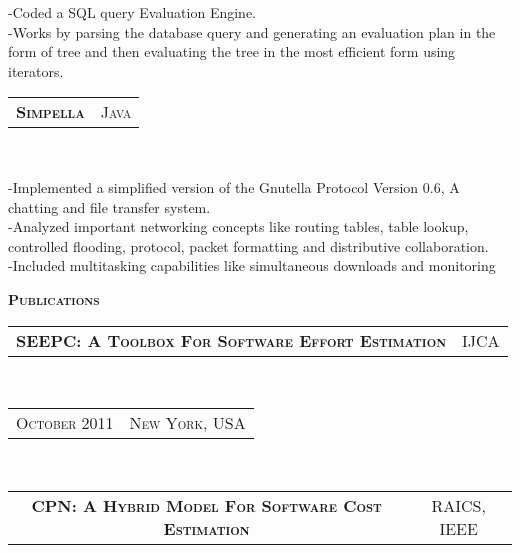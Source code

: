 \documentclass[10pt,a4paper,oneside]{article}
\begin{document}
     \vspace{-4mm}
    \begin{adjustwidth}{7pt}{0pt}
        {\footnotesize -Coded a SQL query Evaluation Engine.\\
        -Works by parsing the database query and generating an evaluation plan in the form of tree and then evaluating the tree in the most efficient form using iterators.}\\
    \end{adjustwidth}
    \begin{tabular}{c|c}
        \textbf{\normalsize S\textsc{impella}}
        &\textmd{\normalsize J\textsc{ava}}
    \end{tabular}\\
     \vspace{-4mm}
    \begin{adjustwidth}{7pt}{0pt}
        {\footnotesize -Implemented a simplified version of the
        Gnutella Protocol Version 0.6, A chatting and file transfer
        system.\\
        -Analyzed important networking concepts like routing tables, table lookup, controlled
        flooding, protocol, packet formatting and distributive
        collaboration.\\
        -Included multitasking capabilities like simultaneous
        downloads and monitoring}\\
    \end{adjustwidth}
    \textcolor{light-gray}{\textbf{\large P\textsc{ublications}}}
    \vspace{10pt}\\
    \begin{tabular}{c|c}
        \textbf{\normalsize SEEPC: A T\textsc{oolbox}
        F\textsc{or} S\textsc{oftware} E\textsc{ffort}
    E\textsc{stimation}}
        &\textmd{\normalsize IJCA}
    \end{tabular}\\
    \textcolor{light-gray}{
        \begin{tabular}{c|c}
            {\small O\textsc{ctober 2011}}
            &{\small N\textsc{ew} Y\textsc{ork}, USA}
        \end{tabular}
    \vspace{10pt}
    }\\ 
    \begin{tabular}{c|c}
        \textbf{\normalsize CPN: A H\textsc{ybrid}
        M\textsc{odel} F\textsc{or} S\textsc{oftware}
    C\textsc{ost} E\textsc{stimation}}
        &\textmd{\normalsize RAICS, IEEE}
    \end{tabular}\\
\end{document}

